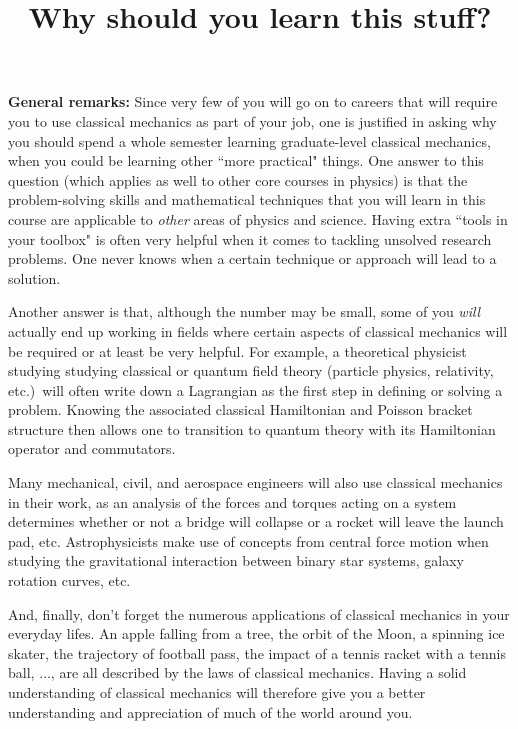 \documentclass[10pt]{article}
\numberwithin{equation}{section}
\begin{document}
\setlength{\parindent}{0pt}
\setlength{\parskip}{\medskipamount}

\title{Why should you learn this stuff?}
\maketitle

{\bf General remarks:}
Since very few of you will go on to careers that will 
require you to use classical mechanics as part of your
job, one is justified in asking why you should spend a 
whole semester learning graduate-level classical mechanics, 
when you could be learning other ``more practical" things.
One answer to this question (which applies as well to 
other core courses in physics) is that the problem-solving 
skills and mathematical techniques that you will learn 
in this course are applicable to {\em other} areas 
of physics and science.
Having extra ``tools in your toolbox" is often very helpful
when it comes to tackling unsolved research problems.
One never knows when a certain technique or approach will 
lead to a solution.

Another answer is that, although the number may be small,
some of you {\em will} actually 
end up working in fields where certain aspects of classical 
mechanics will be required or at least be very helpful.
For example, a theoretical physicist studying studying 
classical or quantum field theory (particle physics, 
relativity, etc.)\ will often write 
down a Lagrangian as the first step in defining or 
solving a problem. 
Knowing the associated classical Hamiltonian and 
Poisson bracket structure then allows one to transition 
to quantum theory with its Hamiltonian operator and commutators.

Many mechanical, civil, and aerospace engineers 
will also use classical mechanics in their work, as an analysis 
of the forces and torques acting on a system determines 
whether or not a bridge will collapse or a rocket will leave 
the launch pad, etc.
Astrophysicists make use of concepts from central force 
motion when studying the gravitational interaction between 
binary star systems, galaxy rotation curves, etc.

And, finally, don't forget the numerous applications of
classical mechanics in your everyday lifes.  
An apple falling from a tree, 
the orbit of the Moon, a spinning ice skater,
the trajectory of football pass, the impact of 
a tennis racket with a tennis ball, $\ldots$, are all described 
by the laws of classical mechanics.
Having a solid understanding of classical mechanics will 
therefore give you a better understanding and appreciation 
of much of the world around you.
\end{document}
